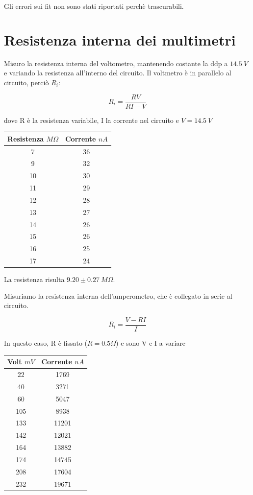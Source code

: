 Gli errori sui fit non sono stati riportati perchè trascurabili. 
\\

\section{Resistenza interna dei multimetri}
Misuro la resistenza interna del voltometro, mantenendo costante la ddp a $14.5\ V$ e variando la resistenza all'interno del circuito. 
Il voltmetro è in parallelo al circuito, perciò $R_i$:

$$R_i = \frac{RV}{RI-V} $$

dove R è la resistenza variabile, I la corrente nel circuito e $V= 14.5\ V$

\begin{center}
\begin{tabular}{*{2}{c}}
Resistenza $M\Omega$ & Corrente $nA$\\
\midrule
7&      36\\
9&      32\\
10& 30\\
11&     29\\
12&     28\\
13&     27\\
14&     26\\
15&     26\\
16&     25\\
17&     24\\

\end{tabular}

\end{center}
La resistenza risulta $9.20 \pm 0.27 \ M \Omega$.


Misuriamo la resistenza interna dell'amperometro, che è collegato in serie al circuito. 

$$R_i = \frac{V-RI}{I}$$

In questo caso, R è fissato ($R=0.5 \Omega$) e sono V e I a variare
\begin{center}
\begin{tabular}{*{2}{c}}
Volt $mV$ & Corrente $nA$\\
\midrule
22&      1769\\
40&      3271\\
60&      5047\\
105&     8938\\
133&     11201\\
142&     12021\\
164&     13882\\
174&     14745\\
208&     17604\\
232&     19671\\



\end{tabular}
\end{center}

